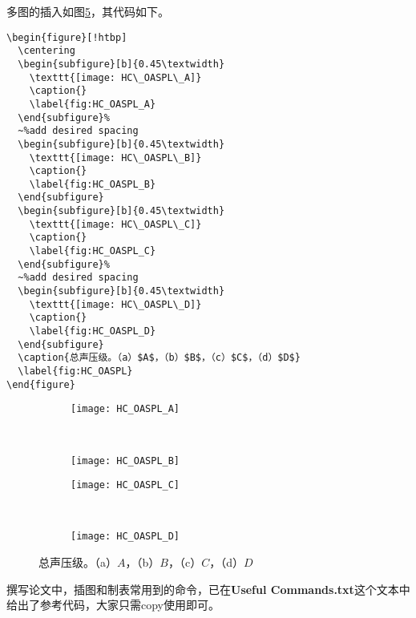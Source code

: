 多图的插入如图\ref{fig:HC_OASPL}，其代码如下。
\begin{verbatim}
\begin{figure}[!htbp]
  \centering
  \begin{subfigure}[b]{0.45\textwidth}
    \texttt{[image: HC\_OASPL\_A]}
    \caption{}
    \label{fig:HC_OASPL_A}
  \end{subfigure}%
  ~%add desired spacing
  \begin{subfigure}[b]{0.45\textwidth}
    \texttt{[image: HC\_OASPL\_B]}
    \caption{}
    \label{fig:HC_OASPL_B}
  \end{subfigure}
  \begin{subfigure}[b]{0.45\textwidth}
    \texttt{[image: HC\_OASPL\_C]}
    \caption{}
    \label{fig:HC_OASPL_C}
  \end{subfigure}%
  ~%add desired spacing
  \begin{subfigure}[b]{0.45\textwidth}
    \texttt{[image: HC\_OASPL\_D]}
    \caption{}
    \label{fig:HC_OASPL_D}
  \end{subfigure}
  \caption{总声压级。（a）$A$，（b）$B$，（c）$C$，（d）$D$}
  \label{fig:HC_OASPL}
\end{figure}
\end{verbatim}
\begin{figure}[!htbp]
  \centering
  \begin{subfigure}[b]{0.45\textwidth}
    \texttt{[image: HC\_OASPL\_A]}
    \caption{}
    \label{fig:HC_OASPL_A}
  \end{subfigure}%
  ~%
  \begin{subfigure}[b]{0.45\textwidth}
    \texttt{[image: HC\_OASPL\_B]}
    \caption{}
    \label{fig:HC_OASPL_B}
  \end{subfigure}
  \begin{subfigure}[b]{0.45\textwidth}
    \texttt{[image: HC\_OASPL\_C]}
    \caption{}
    \label{fig:HC_OASPL_C}
  \end{subfigure}%
  ~%
  \begin{subfigure}[b]{0.45\textwidth}
    \texttt{[image: HC\_OASPL\_D]}
    \caption{}
    \label{fig:HC_OASPL_D}
  \end{subfigure}
  \caption{总声压级。（a）$A$，（b）$B$，（c）$C$，（d）$D$}
  \label{fig:HC_OASPL}
\end{figure}

撰写论文中，插图和制表常用到的命令，已在\textbf{Useful Commands.txt}这个文本中给出了参考代码，大家只需copy使用即可。

